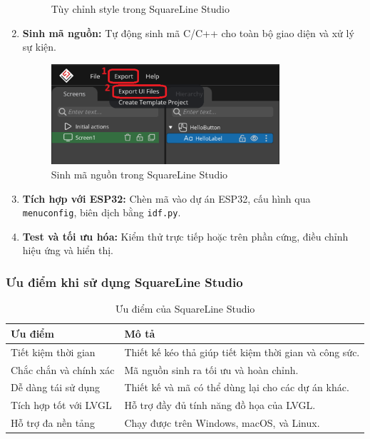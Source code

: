 \begin{enumerate}
\begin{figure}[H]
    \caption{Tùy chỉnh style trong SquareLine Studio}
  \end{figure}
  \item \textbf{Sinh mã nguồn:} Tự động sinh mã C/C++ cho toàn bộ giao diện và xử lý sự kiện.
  \begin{figure}[H]
    \centering
    \includegraphics[width=0.8\textwidth]{Images/export-UI.png}
    \caption{Sinh mã nguồn trong SquareLine Studio}
  \end{figure}
  \item \textbf{Tích hợp với ESP32:} Chèn mã vào dự án ESP32, cấu hình qua \texttt{menuconfig}, biên dịch bằng \texttt{idf.py}.
  \item \textbf{Test và tối ưu hóa:} Kiểm thử trực tiếp hoặc trên phần cứng, điều chỉnh hiệu ứng và hiển thị.
\end{enumerate}

\subsubsection{Ưu điểm khi sử dụng SquareLine Studio}
\begin{table}[H]
\centering
\begin{tabular}{|p{4cm}|p{10cm}|}
\hline
\textbf{Ưu điểm} & \textbf{Mô tả} \\
\hline
Tiết kiệm thời gian & Thiết kế kéo thả giúp tiết kiệm thời gian và công sức. \\
\hline
Chắc chắn và chính xác & Mã nguồn sinh ra tối ưu và hoàn chỉnh. \\
\hline
Dễ dàng tái sử dụng & Thiết kế và mã có thể dùng lại cho các dự án khác. \\
\hline
Tích hợp tốt với LVGL & Hỗ trợ đầy đủ tính năng đồ họa của LVGL. \\
\hline
Hỗ trợ đa nền tảng & Chạy được trên Windows, macOS, và Linux. \\
\hline
\end{tabular}
\caption{Ưu điểm của SquareLine Studio}
\end{table}


